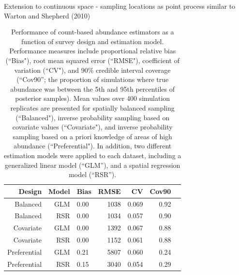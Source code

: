 \documentclass[times,mee,doublespace,]{besauth2}
\begin{document}
Extension to continuous space - sampling locations as point process similar to Warton and Shepherd (2010)






\pagebreak

\begin{table}[ht]
\label{tab:PS}
\caption{Performance of count-based abundance estimators as a function of survey design and estimation model.  Performance measures include proportional relative bias (``Bias"), root mean squared error (``RMSE"), coefficient of variation (``CV"), and 90\% credible interval coverage (``Cov90''; the proportion of simulations where true abundance was between the 5th and 95th percentiles of posterior samples).  Mean values over 400 simulation replicates are presented for spatially balanced sampling (``Balanced"), inverse probability sampling based on covariate values (``Covariate"), and inverse probability sampling based on a priori knowledge of areas of high abundance (``Preferential"). In addition, two different estimation models were applied to each dataset, including a generalized linear model (``GLM''), and a spatial regression model (``RSR'').}
\centering
\begin{tabular}{rrlrrrr}
  \hline
 Design & Model & Bias & RMSE & CV & Cov90 \\
  \hline
Balanced & GLM & 0.00 & 1038 & 0.069 & 0.92 \\
Balanced & RSR & 0.00 & 1034 & 0.057 & 0.90 \\
Covariate & GLM & 0.00 & 1392 & 0.067 & 0.88 \\
Covariate & RSR & 0.00 & 1152 & 0.061 & 0.88 \\
Preferential & GLM & 0.21 & 5807 & 0.060 & 0.24 \\
Preferential & RSR & 0.15 & 3040 & 0.054 & 0.29 \\
   \hline
\end{tabular}
\end{table}

\end{document}

